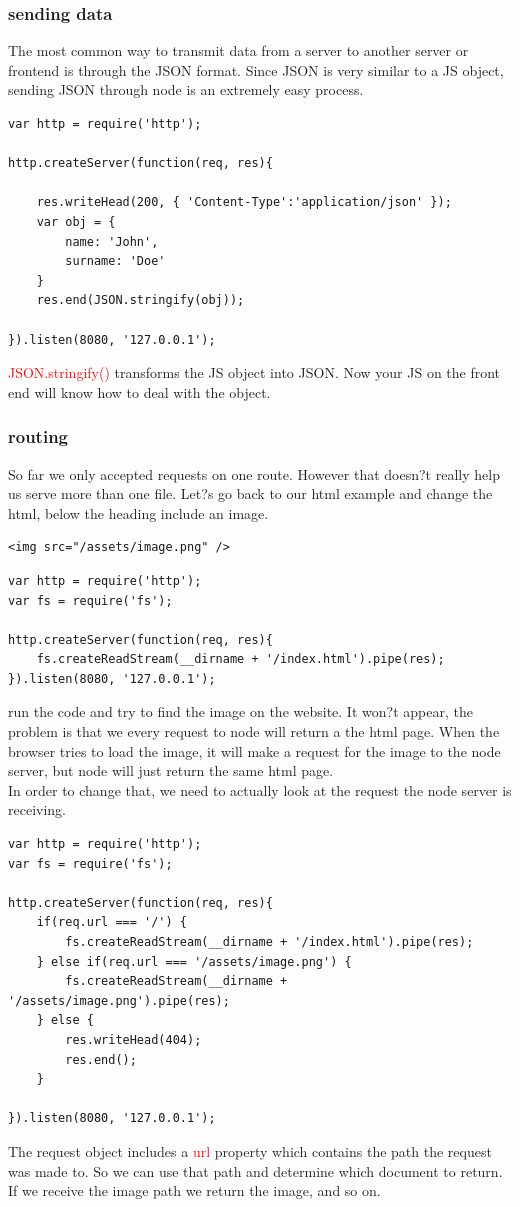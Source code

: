 \documentclass[a4paper]{article}
\begin{document}
\subsubsection{sending data}
The most common way to transmit data from a server to another server or frontend is through the JSON format. Since JSON is very similar to a JS object, sending JSON through node is an extremely easy process.
\begin{lstlisting}
var http = require('http');

http.createServer(function(req, res){

    res.writeHead(200, { 'Content-Type':'application/json' });
    var obj = {
        name: 'John',
        surname: 'Doe'
    }
    res.end(JSON.stringify(obj));

}).listen(8080, '127.0.0.1');
\end{lstlisting}
\textcolor{red}{JSON.stringify()} transforms the JS object into JSON. Now your JS on the front end will know how to deal with the object.
\subsubsection{routing}
So far we only accepted requests on one route. However that doesn?t really help us serve more than one file. Let?s go back to our html example and change the html, below the heading include an image.
\begin{lstlisting}
<img src="/assets/image.png" />
\end{lstlisting}
\begin{lstlisting}
var http = require('http');
var fs = require('fs');

http.createServer(function(req, res){
    fs.createReadStream(__dirname + '/index.html').pipe(res);
}).listen(8080, '127.0.0.1');
\end{lstlisting}
run the code and try to find the image on the website. It won?t appear, the problem is that we every request to node will return a the html page. When the browser tries to load the image, it will make a request for the image to the node server, but node will just return the same html page.\\

In order to change that, we need to actually look at the request the node server is receiving.

\begin{lstlisting}
var http = require('http');
var fs = require('fs');

http.createServer(function(req, res){
    if(req.url === '/') {
        fs.createReadStream(__dirname + '/index.html').pipe(res);
    } else if(req.url === '/assets/image.png') {
        fs.createReadStream(__dirname + '/assets/image.png').pipe(res);
    } else {
        res.writeHead(404);
        res.end();
    }

}).listen(8080, '127.0.0.1');
\end{lstlisting}
The request object includes a \textcolor{red}{url} property which contains the path the request was made to. So we can use that path and determine which document to return. If we receive the image path we return the image, and so on.\\
\end{document}
